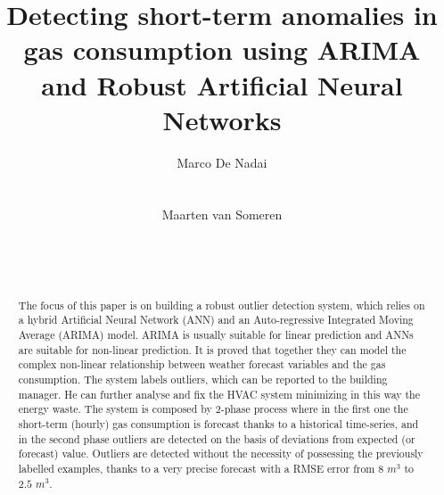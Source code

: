\documentclass{sig-alternate-sigmod07}
\begin{document}
%
\makeatletter
\def\@copyrightspace{\relax}
\makeatother
\title{Detecting short-term anomalies in gas consumption using ARIMA and Robust Artificial Neural Networks}
%
%
\author{
%
%
\alignauthor
Marco De Nadai\\
       \\
      \\
\alignauthor
Maarten van Someren\\ 
       \\
       \\
       \\
}
\maketitle
\begin{abstract}

The focus of this paper is on building a robust outlier detection system, which relies on a hybrid Artificial Neural Network (ANN) and an Auto-regressive Integrated Moving Average (ARIMA) model. ARIMA is usually suitable for linear prediction and ANNs are suitable for non-linear prediction. It is proved that together they can model the complex non-linear relationship between weather forecast variables and the gas consumption. The system labels outliers, which can be reported to the building manager. He can further analyse and fix the HVAC system minimizing in this way the energy waste. 
The system is composed by 2-phase process where in the first one the short-term (hourly) gas consumption is forecast thanks to a historical time-series, and in the second phase outliers are detected on the basis of deviations from expected (or forecast) value. 
Outliers are detected without the necessity of possessing the previously labelled examples, thanks to a very precise forecast with a RMSE error from $8$ $m^3$ to $2.5$ $m^3$.

\end{abstract}
\end{document}
